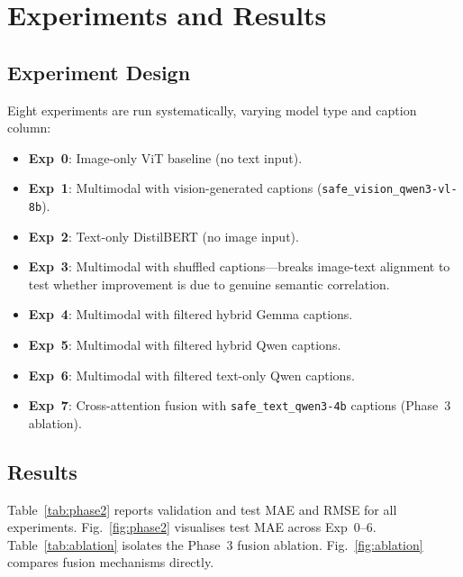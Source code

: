 \documentclass[conference]{IEEEtran}
\begin{document}
\section{Experiments and Results}

\subsection{Experiment Design}

Eight experiments are run systematically, varying model type and caption column:

\begin{itemize}
  \item \textbf{Exp~0}: Image-only ViT baseline (no text input).
  \item \textbf{Exp~1}: Multimodal with vision-generated captions (\texttt{safe\_vision\_qwen3-vl-8b}).
  \item \textbf{Exp~2}: Text-only DistilBERT (no image input).
  \item \textbf{Exp~3}: Multimodal with shuffled captions---breaks image-text alignment to test whether improvement is due to genuine semantic correlation.
  \item \textbf{Exp~4}: Multimodal with filtered hybrid Gemma captions.
  \item \textbf{Exp~5}: Multimodal with filtered hybrid Qwen captions.
  \item \textbf{Exp~6}: Multimodal with filtered text-only Qwen captions.
  \item \textbf{Exp~7}: Cross-attention fusion with \texttt{safe\_text\_qwen3-4b} captions (Phase~3 ablation).
\end{itemize}

\subsection{Results}

Table~\ref{tab:phase2} reports validation and test MAE and RMSE for all experiments.
Fig.~\ref{fig:phase2} visualises test MAE across Exp~0--6.
Table~\ref{tab:ablation} isolates the Phase~3 fusion ablation.
Fig.~\ref{fig:ablation} compares fusion mechanisms directly.
\end{document}
